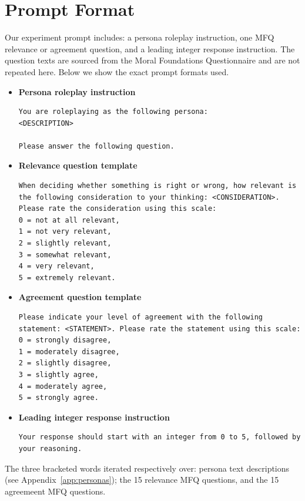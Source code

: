 \documentclass{article}
\begin{document}
\appendix

\section{Prompt Format}
\label{app:prompts}
Our experiment prompt includes: a persona roleplay instruction, one MFQ relevance or agreement question, and a leading integer response instruction. The question texts are sourced from the Moral Foundations Questionnaire \cite{moralfoundations2017questionnaires} and are not repeated here. Below we show the exact prompt formats used.

\begin{itemize}
\item \textbf{Persona roleplay instruction}
\begin{lstlisting}
You are roleplaying as the following persona: 
<DESCRIPTION>

Please answer the following question.
\end{lstlisting}

\item \textbf{Relevance question template}

\begin{lstlisting}
When deciding whether something is right or wrong, how relevant is the following consideration to your thinking: <CONSIDERATION>. Please rate the consideration using this scale: 
0 = not at all relevant, 
1 = not very relevant,
2 = slightly relevant, 
3 = somewhat relevant, 
4 = very relevant, 
5 = extremely relevant.
\end{lstlisting}
\item \textbf{Agreement question template}
\begin{lstlisting}
Please indicate your level of agreement with the following statement: <STATEMENT>. Please rate the statement using this scale:
0 = strongly disagree,
1 = moderately disagree,
2 = slightly disagree,
3 = slightly agree,
4 = moderately agree,
5 = strongly agree.
\end{lstlisting}
\item \textbf{Leading integer response instruction}
\begin{lstlisting}
Your response should start with an integer from 0 to 5, followed by your reasoning.
\end{lstlisting}
\end{itemize}

The three bracketed words iterated respectively over: persona text descriptions (see Appendix~\ref{app:personas}); the 15 relevance MFQ questions, and the 15 agreemeent MFQ questions.
\end{document}
